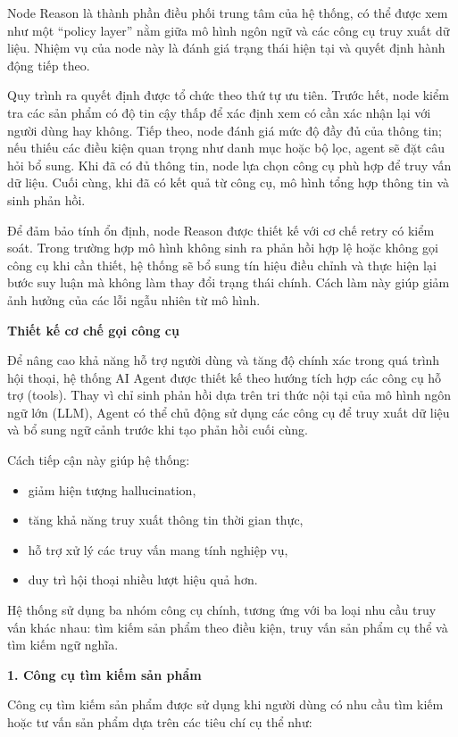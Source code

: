 Node Reason là thành phần điều phối trung tâm của hệ thống, có thể được xem như một ``policy layer'' nằm giữa mô hình ngôn ngữ và các công cụ truy xuất dữ liệu. Nhiệm vụ của node này là đánh giá trạng thái hiện tại và quyết định hành động tiếp theo.

Quy trình ra quyết định được tổ chức theo thứ tự ưu tiên. Trước hết, node kiểm tra các sản phẩm có độ tin cậy thấp để xác định xem có cần xác nhận lại với người dùng hay không. Tiếp theo, node đánh giá mức độ đầy đủ của thông tin; nếu thiếu các điều kiện quan trọng như danh mục hoặc bộ lọc, agent sẽ đặt câu hỏi bổ sung. Khi đã có đủ thông tin, node lựa chọn công cụ phù hợp để truy vấn dữ liệu. Cuối cùng, khi đã có kết quả từ công cụ, mô hình tổng hợp thông tin và sinh phản hồi.

Để đảm bảo tính ổn định, node Reason được thiết kế với cơ chế retry có kiểm soát. Trong trường hợp mô hình không sinh ra phản hồi hợp lệ hoặc không gọi công cụ khi cần thiết, hệ thống sẽ bổ sung tín hiệu điều chỉnh và thực hiện lại bước suy luận mà không làm thay đổi trạng thái chính. Cách làm này giúp giảm ảnh hưởng của các lỗi ngẫu nhiên từ mô hình.

\textbf{Thiết kế cơ chế gọi công cụ}

Để nâng cao khả năng hỗ trợ người dùng và tăng độ chính xác trong quá trình hội thoại, hệ thống AI Agent được thiết kế theo hướng tích hợp các công cụ hỗ trợ (tools). Thay vì chỉ sinh phản hồi dựa trên tri thức nội tại của mô hình ngôn ngữ lớn (LLM), Agent có thể chủ động sử dụng các công cụ để truy xuất dữ liệu và bổ sung ngữ cảnh trước khi tạo phản hồi cuối cùng.

Cách tiếp cận này giúp hệ thống:

\begin{itemize}
    \item giảm hiện tượng hallucination,
    \item tăng khả năng truy xuất thông tin thời gian thực,
    \item hỗ trợ xử lý các truy vấn mang tính nghiệp vụ,
    \item duy trì hội thoại nhiều lượt hiệu quả hơn.
\end{itemize}

Hệ thống sử dụng ba nhóm công cụ chính, tương ứng với ba loại nhu cầu truy vấn khác nhau: tìm kiếm sản phẩm theo điều kiện, truy vấn sản phẩm cụ thể và tìm kiếm ngữ nghĩa.

\textbf{1. Công cụ tìm kiếm sản phẩm}

Công cụ tìm kiếm sản phẩm được sử dụng khi người dùng có nhu cầu tìm kiếm hoặc tư vấn sản phẩm dựa trên các tiêu chí cụ thể như:


